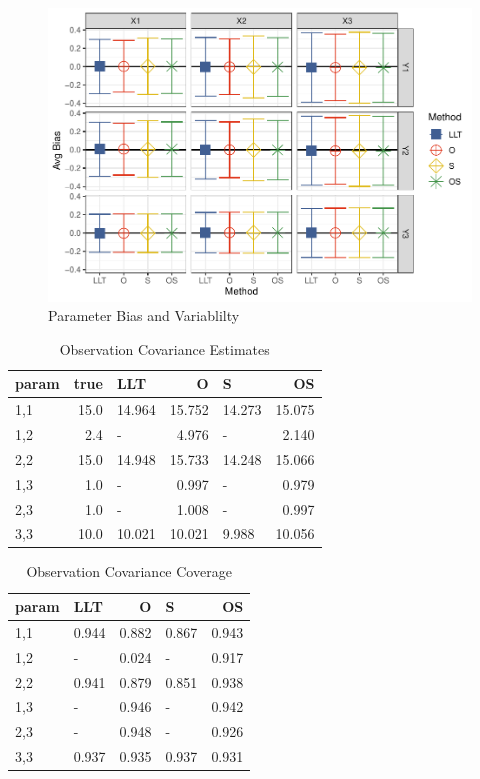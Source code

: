 \documentclass[
]{article}
\begin{document}
\begin{figure}
\centering
\includegraphics{FullSimulation_files/figure-latex/unnamed-chunk-21-1.pdf}
\caption{\label{fig:unnamed-chunk-21}Parameter Bias and Variablilty}
\end{figure}

\begin{longtable}[t]{l|r|l|r|l|r}
\caption{\label{tab:unnamed-chunk-22}Observation Covariance Estimates}\\
\hline
param & true & LLT & O & S & OS\\
\hline
1,1 & 15.0 & 14.964 & 15.752 & 14.273 & 15.075\\
\hline
1,2 & 2.4 & - & 4.976 & - & 2.140\\
\hline
2,2 & 15.0 & 14.948 & 15.733 & 14.248 & 15.066\\
\hline
1,3 & 1.0 & - & 0.997 & - & 0.979\\
\hline
2,3 & 1.0 & - & 1.008 & - & 0.997\\
\hline
3,3 & 10.0 & 10.021 & 10.021 & 9.988 & 10.056\\
\hline
\end{longtable}

\begin{longtable}[t]{l|l|r|l|r}
\caption{\label{tab:unnamed-chunk-23}Observation Covariance Coverage}\\
\hline
param & LLT & O & S & OS\\
\hline
1,1 & 0.944 & 0.882 & 0.867 & 0.943\\
\hline
1,2 & - & 0.024 & - & 0.917\\
\hline
2,2 & 0.941 & 0.879 & 0.851 & 0.938\\
\hline
1,3 & - & 0.946 & - & 0.942\\
\hline
2,3 & - & 0.948 & - & 0.926\\
\hline
3,3 & 0.937 & 0.935 & 0.937 & 0.931\\
\hline
\end{longtable}
\end{document}

